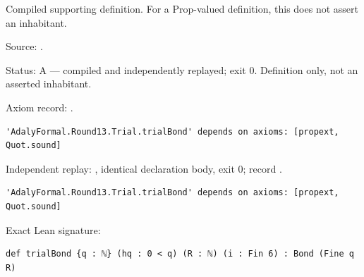 \begin{definition}[bp-351]
\label{bp-351}
\leanok
Compiled supporting definition. For a Prop-valued definition, this does not assert an inhabitant.

\par Source: \texttt{}.
\par Status: A — compiled and independently replayed; exit 0. Definition only, not an asserted inhabitant.
\par Axiom record: \texttt{}.
\begin{verbatim}
'AdalyFormal.Round13.Trial.trialBond' depends on axioms: [propext, Quot.sound]
\end{verbatim}
\par Independent replay: \texttt{}, identical declaration body, exit 0; record \texttt{}.
\begin{verbatim}
'AdalyFormal.Round13.Trial.trialBond' depends on axioms: [propext, Quot.sound]
\end{verbatim}
\par Exact Lean signature:
\begin{verbatim}
def trialBond {q : ℕ} (hq : 0 < q) (R : ℕ) (i : Fin 6) : Bond (Fine q R)
\end{verbatim}
\end{definition}

